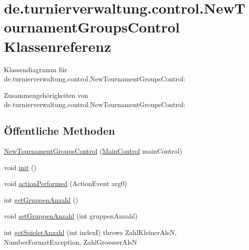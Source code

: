 \hypertarget{classde_1_1turnierverwaltung_1_1control_1_1_new_tournament_groups_control}{}\section{de.\+turnierverwaltung.\+control.\+New\+Tournament\+Groups\+Control Klassenreferenz}
\label{classde_1_1turnierverwaltung_1_1control_1_1_new_tournament_groups_control}


Klassendiagramm für de.\+turnierverwaltung.\+control.\+New\+Tournament\+Groups\+Control\+:


Zusammengehörigkeiten von de.\+turnierverwaltung.\+control.\+New\+Tournament\+Groups\+Control\+:
\subsection*{Öffentliche Methoden}
\begin{DoxyCompactItemize}
\item 
\hyperlink{classde_1_1turnierverwaltung_1_1control_1_1_new_tournament_groups_control_a24642f5fd025ae36b79cca8b8301acd1}{New\+Tournament\+Groups\+Control} (\hyperlink{classde_1_1turnierverwaltung_1_1control_1_1_main_control}{Main\+Control} main\+Control)
\item 
void \hyperlink{classde_1_1turnierverwaltung_1_1control_1_1_new_tournament_groups_control_af2d575eb56d70ed6f62b3aacf23ca608}{init} ()
\item 
void \hyperlink{classde_1_1turnierverwaltung_1_1control_1_1_new_tournament_groups_control_af986d76eadc56130415df40e91d3760f}{action\+Performed} (Action\+Event arg0)
\item 
int \hyperlink{classde_1_1turnierverwaltung_1_1control_1_1_new_tournament_groups_control_ab615f0878f170cf24dc9d4637191568c}{get\+Gruppen\+Anzahl} ()
\item 
void \hyperlink{classde_1_1turnierverwaltung_1_1control_1_1_new_tournament_groups_control_aac0c4715594cb1807b5b930c7b3e4ae0}{set\+Gruppen\+Anzahl} (int gruppen\+Anzahl)
\item 
int \hyperlink{classde_1_1turnierverwaltung_1_1control_1_1_new_tournament_groups_control_aa1f8c1d68d47bbe8c04f2aecec12e21a}{get\+Spieler\+Anzahl} (int indexI)  throws Zahl\+Kleiner\+Als\+N, Number\+Format\+Exception, Zahl\+Groesser\+Als\+N 
\end{DoxyCompactItemize}


